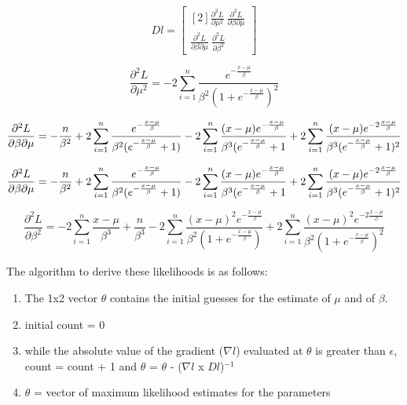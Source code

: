 \documentclass{svproc}
\begin{document}
$$
Dl = \begin{bmatrix}[2] \frac{\partial ^2L}{\partial \mu^2} \ \frac{\partial ^2L}{\partial \beta \partial \mu} \\
\frac{\partial ^2L}{\partial \beta \partial \mu} \ \frac{\partial ^2L}{\partial \beta^2}
\end{bmatrix}
$$

\bigskip

{\scriptsize
\begin{equation}
\frac{\partial ^2L}{\partial \mu^2} = - 2 \sum_{i=1}^{n} \frac{e^{-\frac{x-\mu}{\beta}}}{\beta^2(1+e^{-\frac{x-\mu}{\beta}})^2}
\label{2.4}
\end{equation}

\begin{equation}
\begingroup\makeatletter\def\f@size{5}\check@mathfonts
\frac{\partial ^2L}{\partial \beta \partial \mu} = - \frac{n}{\beta^2} + 2 \sum_{i=1}^n \frac{e^{-\frac{x-\mu}{\beta}}}{\beta^2 (e^{-\frac{x-\mu}{\beta}} + 1)} - 2 \sum_{i=1}^{n} \frac{(x-\mu) e^{-\frac{x-\mu}{\beta}}}{\beta^3 (e^{-\frac{x-\mu}{\beta}} + 1} + 
2 \sum_{i=1}^{n} \frac{(x-\mu) e^{-2\frac{x-\mu}{\beta}}}{\beta^3 (e^{-\frac{x-\mu}{\beta}} + 1)^2}
\endgroup
\label{2.5}
\end{equation}

\begin{equation}
\frac{\partial ^2L}{\partial \beta \partial \mu} = - \frac{n}{\beta^2} + 2 \sum_{i=1}^n \frac{e^{-\frac{x-\mu}{\beta}}}{\beta^2 (e^{-\frac{x-\mu}{\beta}} + 1)} - 2 \sum_{i=1}^{n} \frac{(x-\mu) e^{-\frac{x-\mu}{\beta}}}{\beta^3 (e^{-\frac{x-\mu}{\beta}} + 1} \\
+ 2 \sum_{i=1}^{n} \frac{(x-\mu) e^{-2\frac{x-\mu}{\beta}}}{\beta^3 (e^{-\frac{x-\mu}{\beta}} + 1)^2}
\label{2.6}
\end{equation}

\begin{equation}
\frac{\partial ^2L}{\partial \beta^2} =  -2 \sum_{i=1}^{n} \frac{x-\mu}{\beta^3} + \frac{n}{\beta^3} - 2 \sum_{i=1}^{n} \frac{(x-\mu)^2 e^{-\frac{x-\mu}{\beta}}}{\beta^2 (1+e^{-\frac{x-\mu}{\beta}})} + 2 \sum_{i=1}^{n} \frac{(x-\mu)^2 e^{-2\frac{x-\mu}{\beta}}}{\beta^2 (1 + e^{-\frac{x-\mu}{\beta}})^2}
\label{2.7}
\end{equation}
}%

\bigskip

The algorithm to derive these likelihoods is as follows:
\begin{enumerate}
\item The 1x2 vector \textbf{$\theta$} contains the initial guesses for the estimate of $\mu$ and of $\beta$. 
\item initial count = 0
\item while the absolute value of the gradient ($\nabla l$) evaluated at $\theta$ is greater than $\epsilon$, count = count + 1 and \textbf{$\theta$} = \textbf{$\theta$} - ($\nabla l$ x $Dl$)$^{-1}$
\item \textbf{$\theta$} = vector of maximum likelihood estimates for the parameters 
\end{enumerate}
\end{document}
